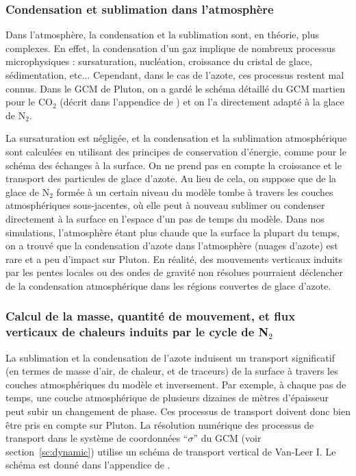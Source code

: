 \subsubsection{Condensation et sublimation dans l’atmosphère}

Dans l’atmosphère, la condensation et la sublimation sont, en théorie, plus complexes. En effet, la condensation d’un gaz implique de nombreux processus microphysiques : sursaturation,  nucléation, croissance du cristal de glace, sédimentation, etc... Cependant, dans le cas de l’azote, ces processus restent mal connus. Dans le GCM de Pluton, on a gardé le schéma détaillé du GCM martien pour le CO$_2$ (décrit dans l’appendice de \citet{Forg:98}) et on l’a directement adapté à la glace de N$_2$.

La sursaturation est négligée, et la condensation et la sublimation atmosphérique sont calculées en utilisant des principes de conservation d’énergie, comme pour le schéma des échanges à la surface. 
On ne prend pas en compte la croissance et le transport des particules de glace d’azote. 
Au lieu de cela, on suppose que de la glace de N$_2$ formée à un certain niveau du modèle tombe à travers les couches atmosphériques sous-jacentes, où elle peut à nouveau sublimer ou condenser directement à la surface en l’espace d’un pas de temps du modèle. 
Dans nos simulations, l’atmosphère étant plus chaude que la surface la plupart du temps, on a trouvé que la condensation d’azote dans l’atmosphère (nuages d’azote) est rare et a peu d’impact sur Pluton. En réalité, des mouvements verticaux induits par les pentes locales ou des ondes de gravité non résolues pourraient déclencher de la condensation atmosphérique dans les régions couvertes de glace d’azote. 

\subsubsection{Calcul de la masse, quantité de mouvement, et flux verticaux de chaleurs induits par le cycle de N$_2$}

La sublimation et la condensation de l’azote induisent un transport significatif (en termes de masse d’air, de chaleur, et de traceurs) de la surface à travers les couches atmosphériques du modèle et inversement. 
Par exemple, à chaque pas de temps, une couche atmosphérique de plusieurs dizaines de mètres d’épaisseur peut subir un changement de phase. Ces processus de transport doivent donc bien être pris en compte sur Pluton.
La résolution numérique des processus de transport dans le système de coordonnées ``$\sigma$'' du GCM (voir section~\ref{sc:dynamic}) utilise un schéma de transport vertical de Van-Leer I. Le schéma est donné dans l’appendice de \citet{Forg:17}. 

